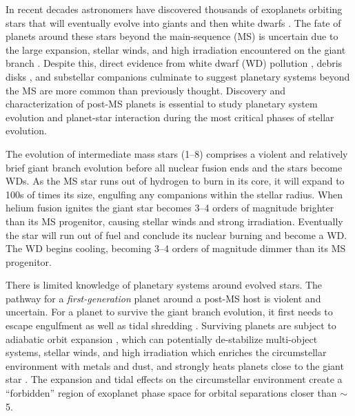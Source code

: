 \documentclass[twocolumn]{aastex631}
\begin{document}
In recent decades astronomers have discovered thousands of exoplanets orbiting stars that will eventually evolve into giants and then white dwarfs \citep{akesonNASAExoplanetArchive2013}. The fate of planets around these stars beyond the main-sequence (MS) is uncertain due to the large expansion, stellar winds, and high irradiation encountered on the giant branch \citep{verasPostmainsequencePlanetarySystem2016}. Despite this, direct evidence from white dwarf (WD) pollution \citep{juraExternallyPollutedWhite2007,xuSpitzerObservationsWhite2012}, debris disks \citep{deruyterKeplerianDiscsPostAGB2006,zuckermanAncientPlanetarySystems2010,koesterFrequencyPlanetaryDebris2014}, and substellar companions \citep[e.g.,][]{luhmanDiscoveryCandidateCoolest2011,vanderburgGiantPlanetCandidate2020,blackmanJovianAnalogueOrbiting2021} culminate to suggest planetary systems beyond the MS are more common than previously thought. Discovery and characterization of post-MS planets is essential to study planetary system evolution and planet-star interaction during the most critical phases of stellar evolution.

The evolution of intermediate mass stars (\qtyrange{1}{8}{\solarmass}) comprises a violent and relatively brief giant branch evolution before all nuclear fusion ends and the stars become WDs. As the MS star runs out of hydrogen to burn in its core, it will expand to 100s of times its size, engulfing any companions within the stellar radius. When helium fusion ignites the giant star becomes \numrange{3}{4} orders of magnitude brighter than its MS progenitor, causing stellar winds and strong irradiation. Eventually the star will run out of fuel and conclude its nuclear burning and become a WD. The WD begins cooling, becoming \numrange{3}{4} orders of magnitude dimmer than its MS progenitor.

There is limited knowledge of planetary systems around evolved stars. The pathway for a \textit{first-generation} planet around a post-MS host is violent and uncertain. For a planet to survive the giant branch evolution, it first needs to escape engulfment as well as tidal shredding \citep{burleighImagingPlanetsNearby2002a,nordhausOrbitsLowmassCompanions2013}. Surviving planets are subject to adiabatic orbit expansion \citep{jeansCosmogonicProblemsAssociated1924}, which can potentially de-stabilize multi-object systems, stellar winds, and high irradiation which enriches the circumstellar environment with metals and dust, and strongly heats planets close to the giant star \citep{mustillForetellingsRagnarokWorldengulfing2012,verasPostmainsequencePlanetarySystem2016}. The expansion and tidal effects on the circumstellar environment create a ``forbidden'' region of exoplanet phase space for orbital separations closer than $\sim$\qty{5}{\au}.
\end{document}
